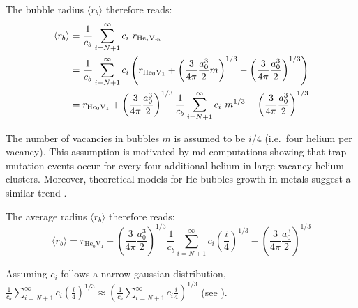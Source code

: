 The bubble radius $\langle r_b \rangle$ therefore reads:
\begin{subequations}
    \begin{align}
        \langle r_b \rangle &=  \frac{1}{c_b}\sum\limits_{i=N+1}^\infty  c_i \ r_{\mathrm{He}_i\mathrm{V}_m}\\
        &= \frac{1}{c_b}\sum\limits_{i=N+1}^\infty c_i \left( r_{\mathrm{He}_0 \mathrm{V}_1} + \left(\frac{3}{4 \pi} \frac{a_0^3}{2} m \right)^{1/3} - \left(\frac{3}{4 \pi} \frac{a_0^3}{2} \right)^{1/3} \right)\\
        &= r_{\mathrm{He}_0 \mathrm{V}_1} + \left(\frac{3}{4 \pi} \frac{a_0^3}{2} \right)^{1/3} \frac{1}{c_b}\sum\limits_{i=N+1}^\infty c_i \ m^{1/3} - \left(\frac{3}{4 \pi} \frac{a_0^3}{2} \right)^{1/3}
    \end{align}
    \labeq{radius average}
\end{subequations}

The number of vacancies in bubbles $m$ is assumed to be $i/4$ (i.e.\ four helium per vacancy).
This assumption is motivated by \gls{md} computations showing that \gls{trap mutation} events occur for every four additional helium in large \gls{vacancy}-helium clusters.
Moreover, theoretical models for He bubbles growth in metals suggest a similar trend .

The average radius $\langle r_b \rangle$ therefore reads:
\begin{equation}
    \langle r_b \rangle = r_{\mathrm{He}_0 \mathrm{V}_1} + \left(\frac{3}{4 \pi} \frac{a_0^3}{2} \right)^{1/3} \frac{1}{c_b}\sum\limits_{i=N+1}^\infty c_i(\frac{i}{4})^{1/3} - \left(\frac{3}{4 \pi} \frac{a_0^3}{2} \right)^{1/3}
\end{equation}

Assuming $c_i$ follows a narrow gaussian distribution, $\frac{1}{c_b}\sum\limits_{i=N+1}^\infty c_i(\frac{i}{4})^{1/3} \approx \left( \frac{1}{c_b}\sum\limits_{i=N+1}^\infty c_i\frac{i}{4} \right)^{1/3} $ (see ).

